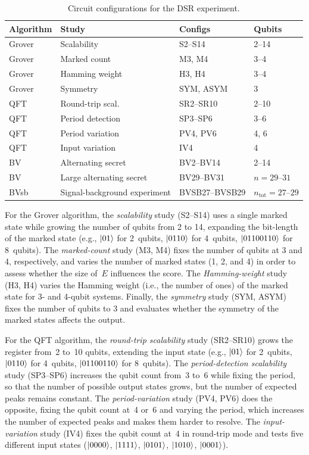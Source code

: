 \documentclass[10pt,conference]{IEEEtran}
\begin{document}
\begin{table}[ht!]
\centering
\caption{Circuit configurations for the DSR experiment.}
\label{tab:workloads}
\begin{tabular}{llll}
\hline
\textbf{Algorithm} & \textbf{Study} & \textbf{Configs} & \textbf{Qubits} \\
\hline
Grover & Scalability       & S2--S14      & 2--14 \\
Grover & Marked count      & M3, M4       & 3--4 \\
Grover & Hamming weight    & H3, H4       & 3--4 \\
Grover & Symmetry          & SYM, ASYM    & 3 \\
\hline
QFT    & Round-trip scal.  & SR2--SR10    & 2--10 \\
QFT    & Period detection  & SP3--SP6     & 3--6 \\
QFT    & Period variation  & PV4, PV6     & 4, 6 \\
QFT    & Input variation   & IV4          & 4 \\
\hline
BV     & Alternating secret & BV2--BV14  & 2--14 \\
BV     & Large alternating secret & BV29--BV31 & $n=29$--$31$ \\
BVsb & Signal-background experiment & BVSB27--BVSB29 & $n_{\mathrm{tot}}=27$--$29$ \\
\hline
\end{tabular}
\end{table}


For the Grover algorithm, the \emph{scalability} study (S2--S14) uses a single marked state while growing the number of qubits from 2 to 14, expanding the bit-length of the marked state (e.g., $\ket{01}$ for 2~qubits, $\ket{0110}$ for 4~qubits, $\ket{01100110}$ for 8~qubits). The \emph{marked-count} study (M3, M4) fixes the number of qubits at 3 and 4, respectively, and varies the number of marked states (1, 2, and 4) in order to assess whether the size of~$E$ influences the score. The \emph{Hamming-weight} study (H3, H4) varies the Hamming weight (i.e., the number of ones) of the marked state for 3- and 4-qubit systems. Finally, the \emph{symmetry} study (SYM, ASYM) fixes the number of qubits to 3 and evaluates whether the symmetry of the marked states affects the output.

For the QFT algorithm, the \emph{round-trip scalability} study (SR2--SR10) grows the register from~2 to~10 qubits, extending the input state (e.g., $\ket{01}$ for 2~qubits, $\ket{0110}$ for 4~qubits, $\ket{01100110}$ for 8~qubits). The \emph{period-detection scalability} study (SP3--SP6) increases the qubit count from~3 to~6 while fixing the period, so that the number of possible output states grows, but the number of expected peaks remains constant. The \emph{period-variation} study (PV4, PV6) does the opposite, fixing the qubit count at~4 or~6 and varying the period, which increases the number of expected peaks and makes them harder to resolve. The \emph{input-variation} study (IV4) fixes the qubit count at~4 in round-trip mode and tests five different input states ($\ket{0000}$, $\ket{1111}$, $\ket{0101}$, $\ket{1010}$, $\ket{0001}$).
\end{document}
